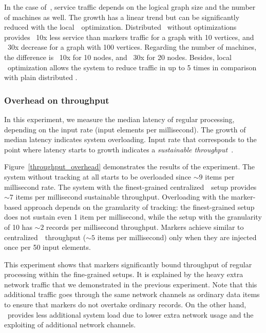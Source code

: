 In the case of~\tracker , service traffic depends on the logical graph size and the number of machines as well. 
The growth has a linear trend but can be significantly reduced with the local~\tracker\ optimization. Distributed \tracker\ without optimizations provides ~10x less service than markers traffic for a graph with 10 vertices, and ~30x decrease for a graph with 100 vertices. Regarding the number of machines, the difference is ~10x for 10 nodes, and ~30x for 20 nodes. Besides, local \tracker\ optimization allows the system to reduce traffic in up to 5 times in comparison with plain distributed \tracker .


\subsubsection{Overhead on throughput}

In this experiment, we measure the median latency of regular processing, depending on the input rate (input elements per millisecond). The growth of median latency indicates system overloading. Input rate that corresponds to the point where latency starts to growth indicates a {\em sustainable throughput}~\cite{karimov2018benchmarking}.

Figure~\ref{throughput_overhead} demonstrates the results of the experiment. The system without tracking at all starts to be overloaded since $\sim 9$ items per millisecond rate. The system with the finest-grained centralized~\tracker\ setup provides $\sim 7$ items per millisecond sustainable throughput. Overloading with the marker-based approach depends on the granularity of tracking: the finest-grained setup does not sustain even 1 item per millisecond, while the setup with the granularity of 10 has $\sim 2$ records per millisecond throughput. Markers achieve similar to centralized~\tracker\ throughput ($\sim 5$ items per millisecond) only when they are injected once per 50 input elements.

This experiment shows that markers significantly bound throughput of regular processing within the fine-grained setups. It is explained by the heavy extra network traffic that we demonstrated in the previous experiment. Note that this additional traffic goes through the same network channels as ordinary data items to ensure that markers do not overtake ordinary records. On the other hand, \tracker\ provides less additional system load due to lower extra network usage and the exploiting of additional network channels.

